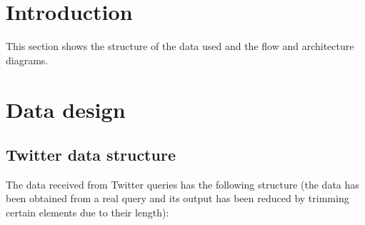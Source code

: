 
\section{Introduction}

\nonzeroparskip This section shows the structure of the data used and the flow and architecture diagrams.

\section{Data design}

\subsection{Twitter data structure}
\nonzeroparskip The data received from Twitter queries has the following structure (the data has been obtained from a real query and its output has been reduced by trimming certain elements due to their length):

